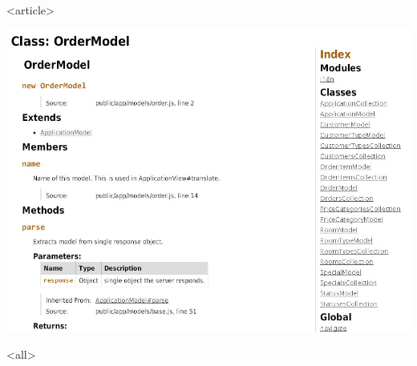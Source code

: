 \mode
<article>

\begin{center}
  \includegraphics[width=.4\paperwidth]{images/jsdoc}
\end{center}

\mode
<all>

{
  \frame[plain]{}
}
